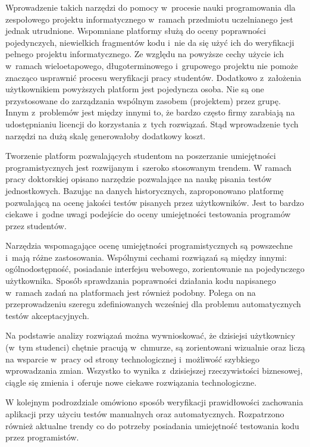 Wprowadzenie takich narzędzi do pomocy w~procesie nauki programowania dla zespołowego projektu informatycznego w~ramach przedmiotu uczelnianego jest jednak utrudnione.
Wspomniane platformy służą do oceny poprawności pojedynczych, niewielkich fragmentów kodu i~nie da się użyć ich do weryfikacji pełnego projektu informatycznego.
Ze względu na powyższe cechy użycie ich w~ramach wieloetapowego, długoterminowego i~grupowego projektu nie pomoże znacząco usprawnić procesu weryfikacji pracy studentów.
Dodatkowo z~założenia użytkownikiem powyższych platform jest pojedyncza osoba.
Nie są one przystosowane do zarządzania wspólnym zasobem (projektem) przez grupę.
Innym z~problemów jest między innymi to, że bardzo często firmy zarabiają na udostępnianiu licencji do korzystania z~tych rozwiązań.
Stąd wprowadzenie tych narzędzi na dużą skalę generowałoby dodatkowy koszt.

Tworzenie platform pozwalających studentom na poszerzanie umiejętności programistycznych jest rozwijanym i~szeroko stosowanym trendem.
W ramach pracy doktorskiej \cite{teach-testing-thesis} opisano narzędzie pozwalające na naukę pisania testów jednostkowych.
Bazując na danych historycznych, zaproponowano platformę pozwalającą na ocenę jakości testów pisanych przez użytkowników.
Jest to bardzo ciekawe i~godne uwagi podejście do oceny umiejętności testowania programów przez studentów.

Narzędzia wspomagające ocenę umiejętności programistycznych są powszechne i~mają różne zastosowania.
Wspólnymi cechami rozwiązań są między innymi: ogólnodostępność, posiadanie interfejsu webowego, zorientowanie na pojedynczego użytkownika.
Sposób sprawdzania poprawności działania kodu napisanego w~ramach zadań na platformach jest również podobny.
Polega on na przeprowadzeniu szeregu zdefiniowanych wcześniej dla problemu automatycznych testów akceptacyjnych.

Na podstawie analizy rozwiązań można wywnioskować, że dzisiejsi użytkownicy (w~tym studenci) chętnie pracują w~chmurze, są zorientowani wizualnie oraz liczą na wsparcie w~pracy od strony technologicznej i~możliwość szybkiego wprowadzania zmian.
Wszystko to wynika z~dzisiejszej rzeczywistości biznesowej, ciągle się zmienia i~oferuje nowe ciekawe rozwiązania technologiczne.

W kolejnym podrozdziale omówiono sposób weryfikacji prawidłowości zachowania aplikacji przy użyciu testów manualnych oraz automatycznych.
Rozpatrzono również aktualne trendy co do potrzeby posiadania umiejętność testowania kodu przez programistów.



